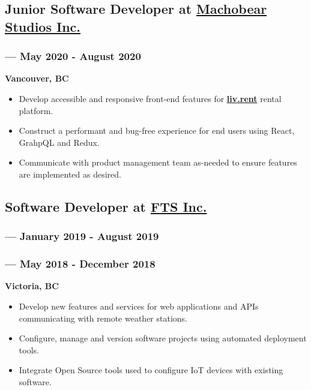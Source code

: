 \documentclass[letterpaper]{article}
\begin{document}
\subsection{Junior Software Developer at \href{https://machobear.ca}{Machobear Studios Inc.}}
\label{sec:org23a2780}
\vspace{-1.2ex}
\subsubsection{ --- May 2020 - August 2020}
\label{sec:org444b98f}
\vspace{1.2ex}
\textbf{Vancouver, BC}
\begin{itemize}
\item Develop accessible and responsive front-end features for \textbf{\href{https://liv.rent}{liv.rent}} rental platform.
\item Construct a performant and bug-free experience for end users using React, GrahpQL and Redux.
\item Communicate with product management team as-needed to ensure features are implemented as desired.
\end{itemize}
\vspace{0.5ex}
\subsection{Software Developer at \href{https://ftsinc.com}{FTS Inc.}}
\label{sec:org3fea330}
\vspace{-1.6ex}
\subsubsection{ --- January 2019 - August 2019}
\label{sec:org843058d}
\vspace{2.4ex}
\subsubsection{ --- May 2018 - December 2018}
\label{sec:orgce50635}
\vspace{-1.9ex}
\textbf{Victoria, BC}
\begin{itemize}
\item Develop new features and services for web applications and APIs communicating with remote weather stations.
\item Configure, manage and version software projects using automated deployment tools.
\item Integrate Open Source tools used to configure IoT devices with existing software.
\end{itemize}
\vspace{0.6ex}
\end{document}
